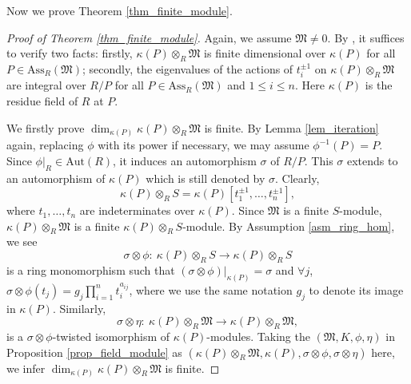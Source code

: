\documentclass[12pt]{amsart}
\theoremstyle{plain}
\theoremstyle{definition}
\theoremstyle{question}
\theoremstyle{remark}
\theoremstyle{assumption}
\numberwithin{equation}{section}
\theoremstyle{bigthm}
\begin{document}
Now we prove Theorem \ref{thm_finite_module}.
\begin{proof}[Proof of Theorem \ref{thm_finite_module}]
Again, we assume $\mathfrak{M} \neq 0$. By \cite[Theorem~G]{Qin_Su_Wang}, it suffices to verify two facts: firstly, $\kappa (P) \otimes_{R} \mathfrak{M}$ is finite dimensional over $\kappa (P)$ for all $P \in \mathrm{Ass}_{R} (\mathfrak{M})$; secondly, the eigenvalues of the actions of $t_{i}^{\pm 1}$ on $\kappa (P) \otimes_{R} \mathfrak{M}$ are integral over $R/P$ for all $P \in \mathrm{Ass}_{R} (\mathfrak{M})$ and $1 \leq i \leq n$. Here $\kappa (P)$ is the residue field of $R$ at $P$.

We firstly prove $\dim_{\kappa (P)} \kappa (P) \otimes_{R} \mathfrak{M}$ is finite. By Lemma \ref{lem_iteration} again, replacing $\phi$ with its power if necessary, we may assume $\phi^{-1} (P) = P$. Since $\phi|_{R} \in \mathrm{Aut} (R)$, it induces an automorphism $\sigma$ of $R/P$. This $\sigma$ extends to an automorphism of $\kappa (P)$ which is still denoted by $\sigma$. Clearly,
\[
\kappa (P) \otimes_{R} S = \kappa (P) [t_{1}^{\pm 1}, \dots, t_{n}^{\pm 1}],
\]
where $t_{1}, \dots, t_{n}$ are indeterminates over $\kappa (P)$. Since $\mathfrak{M}$ is a finite $S$-module, $\kappa (P) \otimes_{R} \mathfrak{M}$ is a finite $\kappa (P) \otimes_{R} S$-module. By Assumption \ref{asm_ring_hom}, we see
\[
\sigma \otimes \phi \colon \ \kappa (P) \otimes_{R} S \rightarrow \kappa (P) \otimes_{R} S
\]
is a ring monomorphism such that $(\sigma \otimes \phi)|_{\kappa (P)} = \sigma$ and $\forall j$, $\sigma \otimes \phi (t_{j}) = g_{j} \prod_{i=1}^{n} t_{i}^{a_{ij}}$, where we use the same notation $g_{j}$ to denote its image in $\kappa (P)$. Similarly,
\[
\sigma \otimes \eta \colon \ \kappa (P) \otimes_{R} \mathfrak{M} \rightarrow \kappa (P) \otimes_{R} \mathfrak{M},
\]
is a $\sigma \otimes \phi$-twisted isomorphism of $\kappa (P)$-modules. Taking the $(\mathfrak{M}, K, \phi, \eta)$ in Proposition \ref{prop_field_module} as $(\kappa (P) \otimes_{R} \mathfrak{M}, \kappa (P), \sigma \otimes \phi, \sigma \otimes \eta)$ here, we infer $\dim_{\kappa (P)} \kappa (P) \otimes_{R} \mathfrak{M}$ is finite.


\end{proof}
\end{document}
